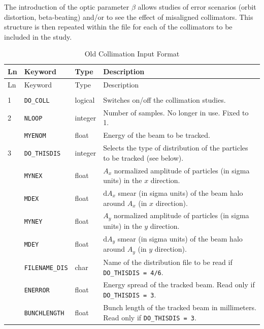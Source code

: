 The introduction of the optic parameter $\beta$ allows studies of error scenarios (orbit distortion, beta-beating) and/or to see the effect of misaligned collimators.
This structure is then repeated within the file for each of the collimators to be included in the study.

\bigskip
\begin{center}
\begin{longtable}{| p{0.5cm} | p{2.4cm} | p{1.2cm} | >{\raggedright\arraybackslash}p{11.4cm}|}
    \caption{Old Collimation Input Format}
    \label{tab:COLL_INP} \\*
    \hline
    \rowcolor{blue!30}
    Ln & Keyword & Type & Description \\*
    \hline
    \endfirsthead

    \hline
    \rowcolor{blue!30}
    Ln & Keyword & Type & Description \\*
    \hline
    \endhead

    \rowcolor{gray!15}
    \multicolumn{4}{|c|}{(The table continues on the next page)}\\*
    \hline
    \endfoot

    \hline
    \endlastfoot

    1   & \texttt{DO\_COLL}      & logical & Switches on/off the collimation studies. \\
    \hline

    2   & \texttt{NLOOP}         & integer & Number of samples. No longer in use. Fixed to 1. \\
        \cline{2-4}
        & \texttt{MYENOM}        & float   & Energy of the beam to be tracked. \\
    \hline

    3   & \texttt{DO\_THISDIS}   & integer & Selects the type of distribution of the particles to be tracked (see below). \\
        \cline{2-4}
        & \texttt{MYNEX}         & float   & $A_x$ normalized amplitude of particles (in sigma units) in the $x$ direction. \\
        \cline{2-4}
        & \texttt{MDEX}          & float   & $\mbox{d}A_x$ smear (in sigma units) of the beam halo around $A_x$ (in $x$ direction). \\
        \cline{2-4}
        & \texttt{MYNEY}         & float   & $A_y$ normalized amplitude of particles (in sigma units) in the $y$ direction. \\
        \cline{2-4}
        & \texttt{MDEY}          & float   & $\mbox{d}A_y$ smear (in sigma units) of the beam halo around $A_y$ (in $y$ direction). \\
        \cline{2-4}
        & \texttt{FILENAME\_DIS} & char    & Name of the distribution file to be read if \texttt{DO\_THISDIS = 4/6}. \\
        \cline{2-4}
        & \texttt{ENERROR}       & float   & Energy spread of the tracked beam. Read only if \texttt{DO\_THISDIS = 3}. \\
        \cline{2-4}
        & \texttt{BUNCHLENGTH}   & float   & Bunch length of the tracked beam in millimeters. Read only if \texttt{DO\_THISDIS = 3}. \\
    \hline


\end{longtable}
\end{center}
